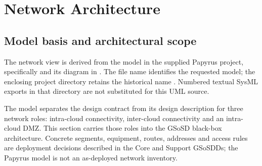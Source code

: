 \section{Network Architecture}
\label{sec:network-architecture}
\subsection{Model basis and architectural scope}
The network view is derived from the  model in the supplied Papyrus project, specifically  and its  diagram in  \cite{arrowhead52NetworkModel20261110}. The file name identifies the requested model; the enclosing project directory retains the historical name . Numbered textual SysML exports in that directory are not substituted for this UML source.

The model separates the design contract from its design description for three network roles: intra-cloud connectivity, inter-cloud connectivity and an intra-cloud DMZ. This section carries those roles into the GSoSD black-box architecture. Concrete segments, equipment, routes, addresses and access rules are deployment decisions described in the Core and Support GSoSDDs; the Papyrus model is not an as-deployed network inventory.

